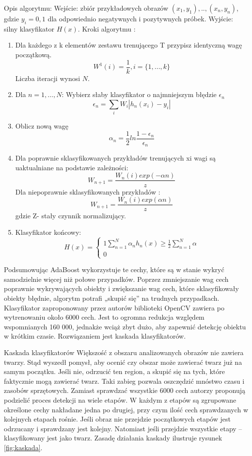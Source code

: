 Opis algorytmu:
Wejście: zbiór przykładowych obrazów $(x_1,y_1),..,(x_n,y_n)$, gdzie $y_i=0,1$ dla odpowiednio negatywnych i pozytywnych próbek.
Wyjście: silny klasyfikator $H(x)$.
Kroki algorytmu :
\begin{enumerate}
\item Dla każdego z k elementów zestawu trenującego T  przypisz identyczną wagę początkową.
$$W^1(i)= \frac{1}{k}  , i = \{1,...,k\} $$
Liczba iteracji wynosi $N$.
\item Dla $n=1,…,N$: 
Wybierz słaby klasyfikator o najmniejszym błędzie $\epsilon_n$
	$$\epsilon_n = \sum_i W_i |h_n(x_i)-y_i	| $$
\item Oblicz nową wagę 
$$\alpha_n = \frac{1}{2} ln \frac{1-\epsilon_n}{\epsilon_n}$$  
\item Dla poprawnie sklasyfikowanych przykładów trenujących xi wagi są uaktualniane na podstawie zależności:
$$W_{n+1} = \frac{W_n(i)exp(-\alpha n)}{z}$$
Dla niepoprawnie sklasyfikowanych przykładów :
$$W_{n+1} = \frac{W_n(i)exp(\alpha n)}{z}$$
gdzie Z- stały czynnik normalizujący.
 
\item Klasyfikator końcowy:
 $$H(x) =\begin{cases}1 \sum^N_{n=1} \alpha_n h_n(x) \geq \frac{1}{2} \sum^N_{n=1} \alpha \\
 0 \end{cases} $$
\end{enumerate} 

Podsumowując AdaBoost wykorzystuje te cechy, które są w stanie wykryć samodzielnie więcej niż połowe przypadków. Poprzez zmniejszanie wag cech poprawnie wykrywających obiekty i zwiększanie wag  cech, które sklasyfikowały obiekty błędnie, algorytm	 potrafi „skupić się” na trudnych przypadkach.	
Klasyfikator zaproponowany przez autorów biblioteki OpenCV zawiera po wytrenowaniu około 6000 cech. Jest to ogromna redukcja względem wspomnianych 160 000,  jednakże wciąż zbyt dużo, aby zapewnić detekcję obiektu w krótkim czasie. Rozwiązaniem jest kaskada klasyfikatorów.

Kaskada klasyfikatorów
Większość z obszaru analizowanych obrazów nie zawiera twarzy. Stąd wyszedł pomysł,  aby ocenić czy obszar może zawierać twarz już na samym początku. Jeśli nie, odrzucić ten region, a skupić się na tych, które faktycznie mogą zawierać twarz. Taki zabieg pozwala oszczędzić mnóstwo czasu i zasobów sprzętowych.
Zamiast sprawdzać wszystkie 6000 cech autorzy proponują podzielić proces detekcji na wiele etapów. W każdym z etapów są zgrupowane określone cechy nakładane jedna po drugiej, przy czym ilość cech sprawdzanych w kolejnych etapach rośnie. Jeśli obraz nie przejdzie początkowych etapów jest odrzucany i sprawdzany jest kolejny. Natomiast jeśli przejdzie wszystkie etapy – klasyfikowany jest jako twarz. Zasadę działania kaskady ilustruje rysunek \ref{fig:kaskada}.

